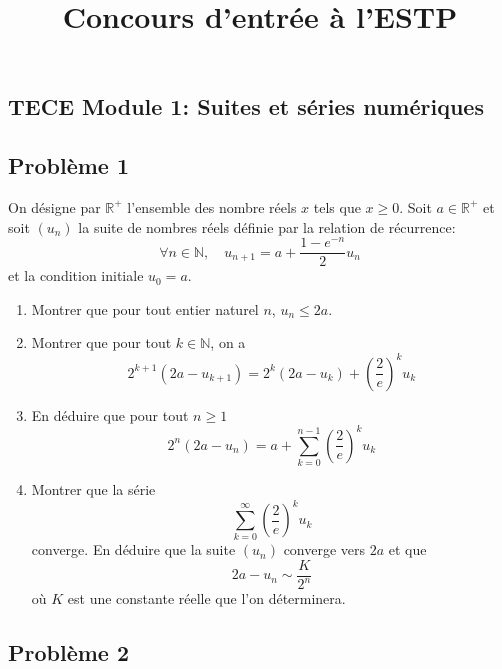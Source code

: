 \documentclass{article}
\title{Concours d'entrée à l'ESTP}
\date{}
\begin{document}
  \lstset{
    frame       = single,
    numbers     = left,
    showspaces  = false,
    showstringspaces    = false,
    captionpos  = t,
    caption     = \lstname
}
\begin{center}
\section*{TECE Module 1: Suites et séries numériques}
\end{center}
\subsection*{Problème 1}
On désigne par $\mathbb{R}^+$ l'ensemble des nombre réels $x$ tels que $x\geq 0$. Soit $a\in \mathbb{R}^+$ et soit $(u_n)$ la suite de nombres réels définie par la relation de récurrence:
\[\forall n\in \mathbb{N},\quad u_{n+1}=a+\frac{1-e^{-n}}{2}u_n\]
et la condition initiale $u_0=a$.
\begin{enumerate}
\item Montrer que pour tout entier naturel $n$, $u_n\leq 2a$.
\item Montrer que pour tout $k\in \mathbb{N}$, on a
\[2^{k+1}(2a-u_{k+1})=2^k(2a-u_k)+\left(\frac{2}{e}\right)^ku_k\]
\item En déduire que pour tout $n\geq 1$
\[2^n(2a-u_n)=a+\sum_{k=0}^{n-1}\left(\frac{2}{e}\right)^ku_k\]
\item Montrer que la série \[\sum_{k=0}^\infty\left(\frac{2}{e}\right)^ku_k\] converge. En déduire que la suite $(u_n)$ converge vers $2a$ et que \[2a-u_n\sim \frac{K}{2^n}\] où $K$ est une constante réelle que l'on déterminera.
\end{enumerate}

\subsection*{Problème 2}
\end{document}
